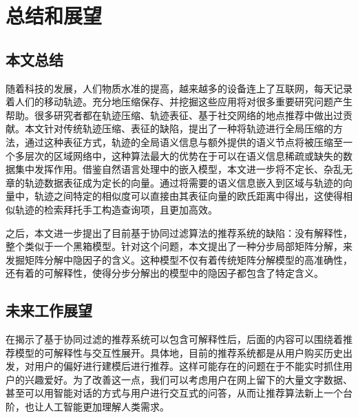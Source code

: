 
\chapter{总结和展望}
\label{chapter:conclusion}

\section{本文总结}
随着科技的发展，人们物质水准的提高，越来越多的设备连上了互联网，每天记录着人们的移动轨迹。充分地压缩保存、并挖掘这些应用将对很多重要研究问题产生帮助。很多研究者都在轨迹压缩、轨迹表征、基于社交网络的地点推荐中做出过贡献。本文针对传统轨迹压缩、表征的缺陷，提出了一种将轨迹进行全局压缩的方法，通过这种表征方式，轨迹的全局语义信息与额外提供的语义节点将被压缩至一个多层次的区域网络中，这种算法最大的优势在于可以在语义信息稀疏或缺失的数据集中发挥作用。借鉴自然语言处理中的嵌入模型，本文进一步将不定长、杂乱无章的轨迹数据表征成为定长的向量。通过将需要的语义信息嵌入到区域与轨迹的向量中，轨迹之间特定的相似度可以直接由其表征向量的欧氏距离中得出，这使得相似轨迹的检索拜托手工构造查询项，且更加高效。

之后，本文进一步提出了目前基于协同过滤算法的推荐系统的缺陷：没有解释性，整个类似于一个黑箱模型。针对这个问题，本文提出了一种分步局部矩阵分解，来发掘矩阵分解中隐因子的含义。这种模型不仅有着传统矩阵分解模型的高准确性，还有着的可解释性，使得分步分解出的模型中的隐因子都包含了特定含义。


\section{未来工作展望}
在揭示了基于协同过滤的推荐系统可以包含可解释性后，后面的内容可以围绕着推荐模型的可解释性与交互性展开。具体地，目前的推荐系统都是从用户购买历史出发，对用户的偏好进行建模后进行推荐。这样可能存在的问题在于不能实时抓住用户的兴趣爱好。为了改善这一点，我们可以考虑用户在网上留下的大量文字数据、甚至可以用智能对话的方式与用户进行交互式的问答，从而让推荐算法新上一个台阶，也让人工智能更加理解人类需求。
\newpage\mbox{}\thispagestyle{empty}\newpage